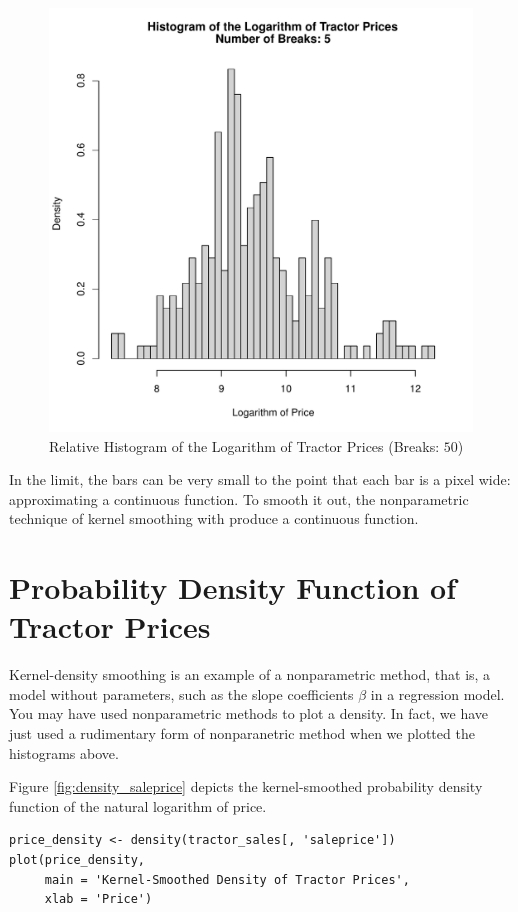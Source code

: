 \documentclass[11pt]{book}
\begin{document}
\begin{figure}[h!]
  \centering
  \includegraphics[scale = 0.5, keepaspectratio=true]{../Figures/hist_log_saleprice_br50}
  \caption{Relative Histogram of the Logarithm of Tractor Prices (Breaks: $50$)} \label{fig:hist_log_saleprice_br50}
\end{figure}

\pagebreak
In the limit, the bars can be very small
to the point that each bar is a pixel wide:
approximating a continuous function.
To smooth it out, the nonparametric technique of
kernel smoothing with produce a continuous function.


\pagebreak
\section{Probability Density Function of Tractor Prices}

Kernel-density smoothing is an example of a nonparametric method,
that is, a model without parameters,
such as the slope coefficients $\beta$ in a regression model.
You may have used nonparametric methods to plot a density.
In fact, we have just used a rudimentary form of nonparanetric method
when we plotted the histograms above.


Figure \ref{fig:density_saleprice} depicts
the kernel-smoothed probability density function of the natural logarithm of
price.
\begin{verbatim}
price_density <- density(tractor_sales[, 'saleprice'])
plot(price_density,
     main = 'Kernel-Smoothed Density of Tractor Prices',
     xlab = 'Price')
\end{verbatim}
\end{document}
